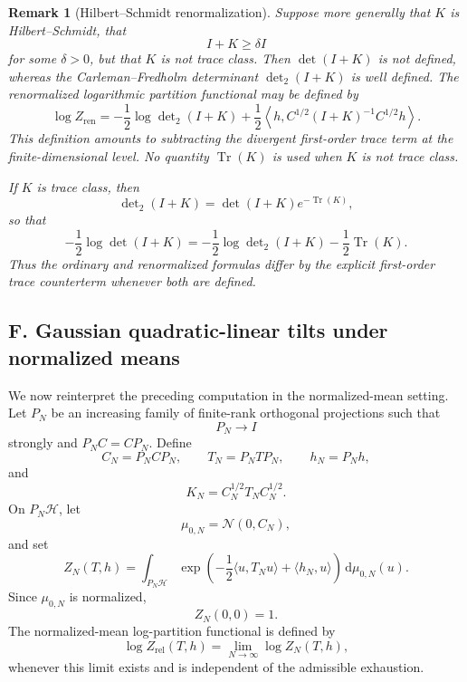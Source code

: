 \documentclass[11pt,reqno]{amsart}
\newtheorem{rem}[Theorem]{Remark}
\begin{document}
\begin{rem}[Hilbert--Schmidt renormalization]
Suppose more generally that $K$ is Hilbert--Schmidt, that
\[
I+K\geq\delta I
\]
for some $\delta>0$, but that $K$ is not trace class. Then
$\det(I+K)$ is not defined, whereas the Carleman--Fredholm determinant
$\det_2(I+K)$ is well defined. The renormalized logarithmic partition
functional may be defined by
\[
\boxed{
\log Z_{\mathrm{ren}}
=
-\frac12\log\det\nolimits_2(I+K)
+
\frac12
\left\langle
h,
C^{1/2}(I+K)^{-1}C^{1/2}h
\right\rangle.
}
\]
This definition amounts to subtracting the divergent first-order trace
term at the finite-dimensional level. No quantity
$\operatorname{Tr}(K)$ is used when $K$ is not trace class.

If $K$ is trace class, then
\[
\det\nolimits_2(I+K)
=
\det(I+K)e^{-\operatorname{Tr}(K)},
\]
so that
\[
-\frac12\log\det(I+K)
=
-\frac12\log\det\nolimits_2(I+K)
-\frac12\operatorname{Tr}(K).
\]
Thus the ordinary and renormalized formulas differ by the explicit
first-order trace counterterm whenever both are defined.
\end{rem}

\subsection*{F. Gaussian quadratic-linear tilts under normalized means}

We now reinterpret the preceding computation in the normalized-mean
setting. Let $P_N$ be an increasing family of finite-rank orthogonal
projections such that
\[
P_N\to I
\]
strongly and $P_NC=CP_N$. Define
\[
C_N=P_NCP_N,
\qquad
T_N=P_NTP_N,
\qquad
h_N=P_Nh,
\]
and
\[
K_N=C_N^{1/2}T_NC_N^{1/2}.
\]
On $P_N\mathcal H$, let
\[
\mu_{0,N}=\mathcal N(0,C_N),
\]
and set
\[
Z_N(T,h)
=
\int_{P_N\mathcal H}
\exp\left(
-\frac12\langle u,T_Nu\rangle+\langle h_N,u\rangle
\right)
\,\mathrm d\mu_{0,N}(u).
\]
Since $\mu_{0,N}$ is normalized,
\[
Z_N(0,0)=1.
\]
The normalized-mean log-partition functional is defined by
\[
\log Z_{\mathrm{rel}}(T,h)
=
\lim_{N\to\infty}\log Z_N(T,h),
\]
whenever this limit exists and is independent of the admissible
exhaustion.
\end{document}
